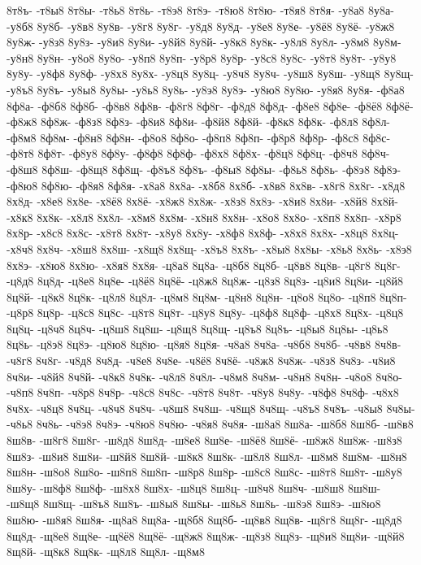 {8т8ъ-
-т8ы8
8т8ы-
-т8ь8
8т8ь-
-т8э8
8т8э-
-т8ю8
8т8ю-
-т8я8
8т8я-
-у8а8
8у8а-
-у8б8
8у8б-
-у8в8
8у8в-
-у8г8
8у8г-
-у8д8
8у8д-
-у8е8
8у8е-
-у8ё8
8у8ё-
-у8ж8
8у8ж-
-у8з8
8у8з-
-у8и8
8у8и-
-у8й8
8у8й-
-у8к8
8у8к-
-у8л8
8у8л-
-у8м8
8у8м-
-у8н8
8у8н-
-у8о8
8у8о-
-у8п8
8у8п-
-у8р8
8у8р-
-у8с8
8у8с-
-у8т8
8у8т-
-у8у8
8у8у-
-у8ф8
8у8ф-
-у8х8
8у8х-
-у8ц8
8у8ц-
-у8ч8
8у8ч-
-у8ш8
8у8ш-
-у8щ8
8у8щ-
-у8ъ8
8у8ъ-
-у8ы8
8у8ы-
-у8ь8
8у8ь-
-у8э8
8у8э-
-у8ю8
8у8ю-
-у8я8
8у8я-
-ф8а8
8ф8а-
-ф8б8
8ф8б-
-ф8в8
8ф8в-
-ф8г8
8ф8г-
-ф8д8
8ф8д-
-ф8е8
8ф8е-
-ф8ё8
8ф8ё-
-ф8ж8
8ф8ж-
-ф8з8
8ф8з-
-ф8и8
8ф8и-
-ф8й8
8ф8й-
-ф8к8
8ф8к-
-ф8л8
8ф8л-
-ф8м8
8ф8м-
-ф8н8
8ф8н-
-ф8о8
8ф8о-
-ф8п8
8ф8п-
-ф8р8
8ф8р-
-ф8с8
8ф8с-
-ф8т8
8ф8т-
-ф8у8
8ф8у-
-ф8ф8
8ф8ф-
-ф8х8
8ф8х-
-ф8ц8
8ф8ц-
-ф8ч8
8ф8ч-
-ф8ш8
8ф8ш-
-ф8щ8
8ф8щ-
-ф8ъ8
8ф8ъ-
-ф8ы8
8ф8ы-
-ф8ь8
8ф8ь-
-ф8э8
8ф8э-
-ф8ю8
8ф8ю-
-ф8я8
8ф8я-
-х8а8
8х8а-
-х8б8
8х8б-
-х8в8
8х8в-
-х8г8
8х8г-
-х8д8
8х8д-
-х8е8
8х8е-
-х8ё8
8х8ё-
-х8ж8
8х8ж-
-х8з8
8х8з-
-х8и8
8х8и-
-х8й8
8х8й-
-х8к8
8х8к-
-х8л8
8х8л-
-х8м8
8х8м-
-х8н8
8х8н-
-х8о8
8х8о-
-х8п8
8х8п-
-х8р8
8х8р-
-х8с8
8х8с-
-х8т8
8х8т-
-х8у8
8х8у-
-х8ф8
8х8ф-
-х8х8
8х8х-
-х8ц8
8х8ц-
-х8ч8
8х8ч-
-х8ш8
8х8ш-
-х8щ8
8х8щ-
-х8ъ8
8х8ъ-
-х8ы8
8х8ы-
-х8ь8
8х8ь-
-х8э8
8х8э-
-х8ю8
8х8ю-
-х8я8
8х8я-
-ц8а8
8ц8а-
-ц8б8
8ц8б-
-ц8в8
8ц8в-
-ц8г8
8ц8г-
-ц8д8
8ц8д-
-ц8е8
8ц8е-
-ц8ё8
8ц8ё-
-ц8ж8
8ц8ж-
-ц8з8
8ц8з-
-ц8и8
8ц8и-
-ц8й8
8ц8й-
-ц8к8
8ц8к-
-ц8л8
8ц8л-
-ц8м8
8ц8м-
-ц8н8
8ц8н-
-ц8о8
8ц8о-
-ц8п8
8ц8п-
-ц8р8
8ц8р-
-ц8с8
8ц8с-
-ц8т8
8ц8т-
-ц8у8
8ц8у-
-ц8ф8
8ц8ф-
-ц8х8
8ц8х-
-ц8ц8
8ц8ц-
-ц8ч8
8ц8ч-
-ц8ш8
8ц8ш-
-ц8щ8
8ц8щ-
-ц8ъ8
8ц8ъ-
-ц8ы8
8ц8ы-
-ц8ь8
8ц8ь-
-ц8э8
8ц8э-
-ц8ю8
8ц8ю-
-ц8я8
8ц8я-
-ч8а8
8ч8а-
-ч8б8
8ч8б-
-ч8в8
8ч8в-
-ч8г8
8ч8г-
-ч8д8
8ч8д-
-ч8е8
8ч8е-
-ч8ё8
8ч8ё-
-ч8ж8
8ч8ж-
-ч8з8
8ч8з-
-ч8и8
8ч8и-
-ч8й8
8ч8й-
-ч8к8
8ч8к-
-ч8л8
8ч8л-
-ч8м8
8ч8м-
-ч8н8
8ч8н-
-ч8о8
8ч8о-
-ч8п8
8ч8п-
-ч8р8
8ч8р-
-ч8с8
8ч8с-
-ч8т8
8ч8т-
-ч8у8
8ч8у-
-ч8ф8
8ч8ф-
-ч8х8
8ч8х-
-ч8ц8
8ч8ц-
-ч8ч8
8ч8ч-
-ч8ш8
8ч8ш-
-ч8щ8
8ч8щ-
-ч8ъ8
8ч8ъ-
-ч8ы8
8ч8ы-
-ч8ь8
8ч8ь-
-ч8э8
8ч8э-
-ч8ю8
8ч8ю-
-ч8я8
8ч8я-
-ш8а8
8ш8а-
-ш8б8
8ш8б-
-ш8в8
8ш8в-
-ш8г8
8ш8г-
-ш8д8
8ш8д-
-ш8е8
8ш8е-
-ш8ё8
8ш8ё-
-ш8ж8
8ш8ж-
-ш8з8
8ш8з-
-ш8и8
8ш8и-
-ш8й8
8ш8й-
-ш8к8
8ш8к-
-ш8л8
8ш8л-
-ш8м8
8ш8м-
-ш8н8
8ш8н-
-ш8о8
8ш8о-
-ш8п8
8ш8п-
-ш8р8
8ш8р-
-ш8с8
8ш8с-
-ш8т8
8ш8т-
-ш8у8
8ш8у-
-ш8ф8
8ш8ф-
-ш8х8
8ш8х-
-ш8ц8
8ш8ц-
-ш8ч8
8ш8ч-
-ш8ш8
8ш8ш-
-ш8щ8
8ш8щ-
-ш8ъ8
8ш8ъ-
-ш8ы8
8ш8ы-
-ш8ь8
8ш8ь-
-ш8э8
8ш8э-
-ш8ю8
8ш8ю-
-ш8я8
8ш8я-
-щ8а8
8щ8а-
-щ8б8
8щ8б-
-щ8в8
8щ8в-
-щ8г8
8щ8г-
-щ8д8
8щ8д-
-щ8е8
8щ8е-
-щ8ё8
8щ8ё-
-щ8ж8
8щ8ж-
-щ8з8
8щ8з-
-щ8и8
8щ8и-
-щ8й8
8щ8й-
-щ8к8
8щ8к-
-щ8л8
8щ8л-
-щ8м8
}
